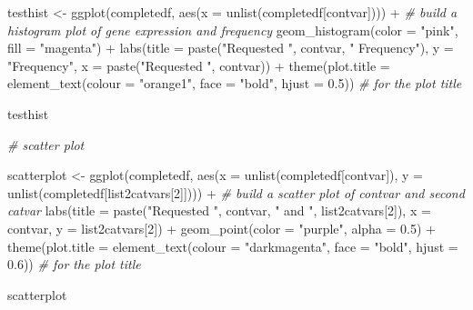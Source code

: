 \documentclass[
]{article}
\newenvironment{Shaded}{\begin{snugshade}}{\end{snugshade}}
\newcommand{\AttributeTok}[1]{\textcolor[rgb]{0.77,0.63,0.00}{#1}}
\newcommand{\CommentTok}[1]{\textcolor[rgb]{0.56,0.35,0.01}{\textit{#1}}}
\newcommand{\DecValTok}[1]{\textcolor[rgb]{0.00,0.00,0.81}{#1}}
\newcommand{\FloatTok}[1]{\textcolor[rgb]{0.00,0.00,0.81}{#1}}
\newcommand{\FunctionTok}[1]{\textcolor[rgb]{0.00,0.00,0.00}{#1}}
\newcommand{\NormalTok}[1]{#1}
\newcommand{\OtherTok}[1]{\textcolor[rgb]{0.56,0.35,0.01}{#1}}
\newcommand{\SpecialCharTok}[1]{\textcolor[rgb]{0.00,0.00,0.00}{#1}}
\newcommand{\StringTok}[1]{\textcolor[rgb]{0.31,0.60,0.02}{#1}}
\begin{document}
\begin{Shaded}
\begin{Highlighting}[]
\NormalTok{  testhist }\OtherTok{\textless{}{-}} \FunctionTok{ggplot}\NormalTok{(completedf, }\FunctionTok{aes}\NormalTok{(}\AttributeTok{x =} \FunctionTok{unlist}\NormalTok{(completedf[contvar]))) }\SpecialCharTok{+} \CommentTok{\# build a histogram plot of gene expression and frequency}
    \FunctionTok{geom\_histogram}\NormalTok{(}\AttributeTok{color =} \StringTok{"pink"}\NormalTok{, }\AttributeTok{fill =} \StringTok{"magenta"}\NormalTok{) }\SpecialCharTok{+}
    \FunctionTok{labs}\NormalTok{(}\AttributeTok{title =} \FunctionTok{paste}\NormalTok{(}\StringTok{"Requested "}\NormalTok{, contvar, }\StringTok{" Frequency"}\NormalTok{), }\AttributeTok{y =} \StringTok{"Frequency"}\NormalTok{, }\AttributeTok{x =} \FunctionTok{paste}\NormalTok{(}\StringTok{"Requested "}\NormalTok{, contvar)) }\SpecialCharTok{+}
    \FunctionTok{theme}\NormalTok{(}\AttributeTok{plot.title =} \FunctionTok{element\_text}\NormalTok{(}\AttributeTok{colour =} \StringTok{"orange1"}\NormalTok{, }\AttributeTok{face =} \StringTok{"bold"}\NormalTok{, }\AttributeTok{hjust =} \FloatTok{0.5}\NormalTok{)) }\CommentTok{\# for the plot title}
  
\NormalTok{  testhist}
  
  \CommentTok{\# scatter plot}
  
\NormalTok{  scatterplot }\OtherTok{\textless{}{-}} \FunctionTok{ggplot}\NormalTok{(completedf, }\FunctionTok{aes}\NormalTok{(}\AttributeTok{x =} \FunctionTok{unlist}\NormalTok{(completedf[contvar]), }\AttributeTok{y =} \FunctionTok{unlist}\NormalTok{(completedf[list2catvars[}\DecValTok{2}\NormalTok{]]))) }\SpecialCharTok{+}  \CommentTok{\# build a scatter plot of contvar and second catvar}
    \FunctionTok{labs}\NormalTok{(}\AttributeTok{title =} \FunctionTok{paste}\NormalTok{(}\StringTok{"Requested "}\NormalTok{, contvar, }\StringTok{" and "}\NormalTok{, list2catvars[}\DecValTok{2}\NormalTok{]), }\AttributeTok{x =}\NormalTok{ contvar, }\AttributeTok{y =}\NormalTok{ list2catvars[}\DecValTok{2}\NormalTok{]) }\SpecialCharTok{+}
    \FunctionTok{geom\_point}\NormalTok{(}\AttributeTok{color =} \StringTok{"purple"}\NormalTok{, }\AttributeTok{alpha =} \FloatTok{0.5}\NormalTok{) }\SpecialCharTok{+}
    \FunctionTok{theme}\NormalTok{(}\AttributeTok{plot.title =} \FunctionTok{element\_text}\NormalTok{(}\AttributeTok{colour =} \StringTok{"darkmagenta"}\NormalTok{, }\AttributeTok{face =} \StringTok{"bold"}\NormalTok{, }\AttributeTok{hjust =} \FloatTok{0.6}\NormalTok{)) }\CommentTok{\# for the plot title}
  
\NormalTok{  scatterplot}
  

\end{Highlighting}
\end{Shaded}
\end{document}
